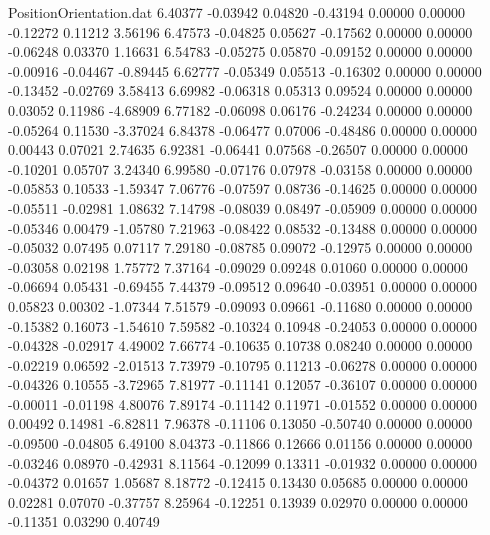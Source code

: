 \begin{filecontents}{PositionOrientation.dat}
   6.40377   -0.03942    0.04820    -0.43194    0.00000    0.00000   -0.12272    0.11212    3.56196
   6.47573   -0.04825    0.05627    -0.17562    0.00000    0.00000   -0.06248    0.03370    1.16631
   6.54783   -0.05275    0.05870    -0.09152    0.00000    0.00000   -0.00916   -0.04467   -0.89445
   6.62777   -0.05349    0.05513    -0.16302    0.00000    0.00000   -0.13452   -0.02769    3.58413
   6.69982   -0.06318    0.05313     0.09524    0.00000    0.00000    0.03052    0.11986   -4.68909
   6.77182   -0.06098    0.06176    -0.24234    0.00000    0.00000   -0.05264    0.11530   -3.37024
   6.84378   -0.06477    0.07006    -0.48486    0.00000    0.00000    0.00443    0.07021    2.74635
   6.92381   -0.06441    0.07568    -0.26507    0.00000    0.00000   -0.10201    0.05707    3.24340
   6.99580   -0.07176    0.07978    -0.03158    0.00000    0.00000   -0.05853    0.10533   -1.59347
   7.06776   -0.07597    0.08736    -0.14625    0.00000    0.00000   -0.05511   -0.02981    1.08632
   7.14798   -0.08039    0.08497    -0.05909    0.00000    0.00000   -0.05346    0.00479   -1.05780
   7.21963   -0.08422    0.08532    -0.13488    0.00000    0.00000   -0.05032    0.07495    0.07117
   7.29180   -0.08785    0.09072    -0.12975    0.00000    0.00000   -0.03058    0.02198    1.75772
   7.37164   -0.09029    0.09248     0.01060    0.00000    0.00000   -0.06694    0.05431   -0.69455
   7.44379   -0.09512    0.09640    -0.03951    0.00000    0.00000    0.05823    0.00302   -1.07344
   7.51579   -0.09093    0.09661    -0.11680    0.00000    0.00000   -0.15382    0.16073   -1.54610
   7.59582   -0.10324    0.10948    -0.24053    0.00000    0.00000   -0.04328   -0.02917    4.49002
   7.66774   -0.10635    0.10738     0.08240    0.00000    0.00000   -0.02219    0.06592   -2.01513
   7.73979   -0.10795    0.11213    -0.06278    0.00000    0.00000   -0.04326    0.10555   -3.72965
   7.81977   -0.11141    0.12057    -0.36107    0.00000    0.00000   -0.00011   -0.01198    4.80076
   7.89174   -0.11142    0.11971    -0.01552    0.00000    0.00000    0.00492    0.14981   -6.82811
   7.96378   -0.11106    0.13050    -0.50740    0.00000    0.00000   -0.09500   -0.04805    6.49100
   8.04373   -0.11866    0.12666     0.01156    0.00000    0.00000   -0.03246    0.08970   -0.42931
   8.11564   -0.12099    0.13311    -0.01932    0.00000    0.00000   -0.04372    0.01657    1.05687
   8.18772   -0.12415    0.13430     0.05685    0.00000    0.00000    0.02281    0.07070   -0.37757
   8.25964   -0.12251    0.13939     0.02970    0.00000    0.00000   -0.11351    0.03290    0.40749

\end{filecontents}
